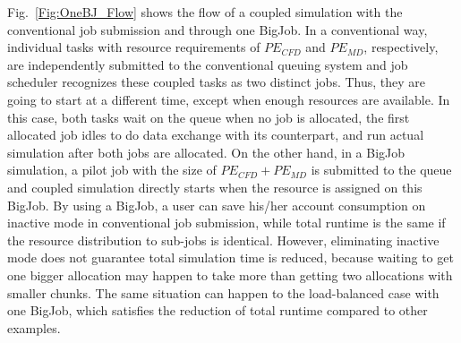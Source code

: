 \documentclass[conference,final]{IEEEtran}
\begin{document}
Fig.~\ref{Fig:OneBJ_Flow} shows the flow of a coupled simulation with
the conventional job submission and through one BigJob. In a
conventional way, individual tasks with resource requirements of
$PE_{CFD}$ and $PE_{MD}$, respectively, are independently submitted to
the conventional queuing system and job scheduler recognizes these
coupled tasks as two distinct jobs. Thus, they are going to start at a
different time, except when enough resources are available. In this
case, both tasks wait on the queue when no job is allocated, the first
allocated job idles to do data exchange with its counterpart, and run
actual simulation after both jobs are allocated. On the other hand, in
a BigJob simulation, a pilot job with the size of $PE_{CFD}+PE_{MD}$
is submitted to the queue and coupled simulation directly starts when
the resource is assigned on this BigJob. By using a BigJob, a user can
save his/her account consumption on inactive mode in conventional job
submission, while total runtime is the same if the resource
distribution to sub-jobs is identical. However, eliminating inactive
mode does not guarantee total simulation time is reduced, because
waiting to get one bigger allocation may happen to take more than
getting two allocations with smaller chunks. The same situation can
happen to the load-balanced case with one BigJob, which satisfies the
reduction of total runtime compared to other examples.
\end{document}
